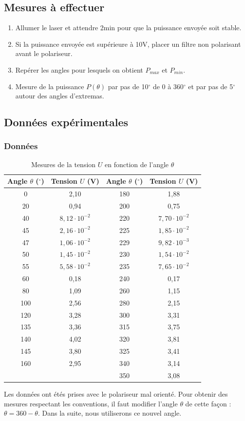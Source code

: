 \documentclass[a4paper,9pt,french]{scrartcl}
\begin{document}
\subsection{Mesures à effectuer}
\begin{enumerate}
    \item Allumer le laser et attendre 2min pour que la puissance envoyée soit stable.
    \item Si la puissance envoyée est supérieure  à 10V, placer un filtre non polarisant avant le polariseur.
    \item Repérer les angles pour lesquels on obtient $P_{max}$ et $P_{min}$.
    \item Mesure de la puissance $P(\theta)$ par pas de 10$^\circ$ de 0 à 360$^\circ$ et par pas de 5$^\circ$ autour des angles d'extremas.
\end{enumerate}
\subsection{Données expérimentales}
\subsubsection{Données}
\begin{table}[H]
\centering
\caption{Mesures de la tension $U$ en fonction de l'angle $\theta$}
\begin{tabular}{|c|c||c|c|}
\hline
\textbf{Angle $\theta$ ($^\circ$)} & \textbf{Tension $U$ (V)} & \textbf{Angle $\theta$ ($^\circ$)} & \textbf{Tension $U$ (V)} \\ \hline
0   & 2,10 & 180 & 1,88 \\ \hline
20  & 0,94 & 200 & 0,75 \\ \hline
40  & $8,12 \cdot 10^{-2}$ & 220 & $7,70 \cdot 10^{-2}$ \\ \hline
45  & $2,16 \cdot 10^{-2}$ & 225 & $1,85 \cdot 10^{-2}$ \\ \hline
47  & $1,06 \cdot 10^{-2}$ & 229 & $9,82 \cdot 10^{-3}$ \\ \hline
50  & $1,45 \cdot 10^{-2}$ & 230 & $1,54 \cdot 10^{-2}$ \\ \hline
55  & $5,58 \cdot 10^{-2}$ & 235 & $7,65 \cdot 10^{-2}$ \\ \hline
60  & 0,18 & 240 & 0,17 \\ \hline
80  & 1,09 & 260 & 1,15 \\ \hline
100 & 2,56 & 280 & 2,15 \\ \hline
120 & 3,28 & 300 & 3,31 \\ \hline
135 & 3,36 & 315 & 3,75 \\ \hline
140 & 4,02 & 320 & 3,81 \\ \hline
145 & 3,80 & 325 & 3,41 \\ \hline
160 & 2,95 & 340 & 3,14 \\ \hline
\multicolumn{2}{|c||}{} & 350 & 3,08 \\ \hline
\end{tabular}
\end{table}
Les données ont étés prises avec le polariseur mal orienté. Pour obtenir des mesures respectant les conventions,
il faut modifier l'angle $\theta$ de cette façon : $\theta = 360-\theta$. Dans la suite, nous utiliserons ce nouvel angle.
\end{document}
